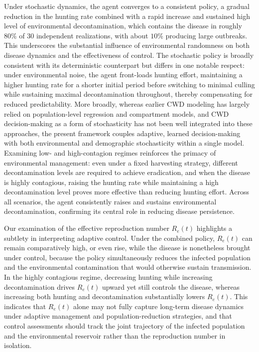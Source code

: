 \documentclass[12pt,a4paper,reqno]{amsart}
\theoremstyle{definition}
\theoremstyle{remark}
\theoremstyle{plain}
\begin{document}
Under stochastic dynamics, the agent converges to a consistent policy, a gradual reduction in the hunting rate combined with a rapid increase and sustained high level of environmental decontamination, which contains the disease in roughly $80\%$ of $30$ independent realizations, with about $10\%$ producing large outbreaks. This underscores the substantial influence of environmental randomness on both disease dynamics and the effectiveness of control. The stochastic policy is broadly consistent with its deterministic counterpart but differs in one notable respect: under environmental noise, the agent front-loads hunting effort, maintaining a higher hunting rate for a shorter initial period before switching to minimal culling while sustaining maximal decontamination throughout, thereby compensating for reduced predictability. More broadly, whereas earlier CWD modeling has largely relied on population-level regression and compartment models, and CWD decision-making as a form of stochasticity has not been well integrated into these approaches, the present framework couples adaptive, learned decision-making with both environmental and demographic stochasticity within a single model. Examining low- and high-contagion regimes reinforces the primacy of environmental management: even under a fixed harvesting strategy, different decontamination levels are required to achieve eradication, and when the disease is highly contagious, raising the hunting rate while maintaining a high decontamination level proves more effective than reducing hunting effort. Across all scenarios, the agent consistently raises and sustains environmental decontamination, confirming its central role in reducing disease persistence.

Our examination of the effective reproduction number $R_e(t)$ highlights a subtlety in interpreting adaptive control. Under the combined policy, $R_e(t)$ can remain comparatively high, or even rise, while the disease is nonetheless brought under control, because the policy simultaneously reduces the infected population and the environmental contamination that would otherwise sustain transmission. In the highly contagious regime, decreasing hunting while increasing decontamination drives $R_e(t)$ upward yet still controls the disease, whereas increasing both hunting and decontamination substantially lowers $R_e(t)$. This indicates that $R_e(t)$ alone may not fully capture long-term disease dynamics under adaptive management and population-reduction strategies, and that control assessments should track the joint trajectory of the infected population and the environmental reservoir rather than the reproduction number in isolation.
\end{document}
